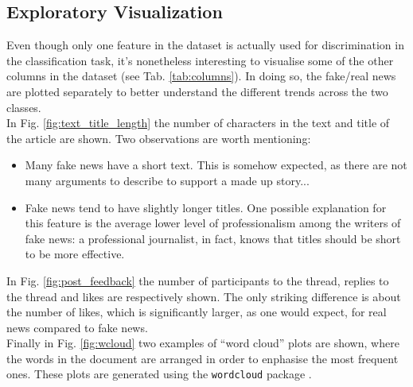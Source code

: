 \documentclass[a4paper,12pt]{article} %
\begin{document}
\subsection{Exploratory Visualization}
\label{sec:visuals}
Even though only one feature in the dataset is actually used for discrimination
in the classification task, it's nonetheless interesting to visualise
some of the other columns in the dataset (see Tab. \ref{tab:columns}).
In doing so, the fake/real news are plotted separately to better understand
the different trends across the two classes. \\
In Fig. \ref{fig:text_title_length} the number of characters in
the text and title of the article are shown.
Two observations are worth mentioning:
\begin{itemize}
\item Many fake news have a short text. This is somehow expected,
as there are not many arguments to describe to support a made up story...
\item Fake news tend to have slightly longer titles.
One possible explanation for this feature is the average lower level
of professionalism among the writers of fake news: a professional
journalist, in fact, knows that titles should be short to be more effective.
\end{itemize}
In Fig. \ref{fig:post_feedback} the
number of participants to the thread, replies to the thread and likes are respectively shown.
The only striking difference is about the number of likes, which is
significantly larger, as one would expect, for real news compared to fake news. \\
Finally in Fig. \ref{fig:wcloud} two examples of ``word cloud'' plots are shown,
where the words in the document are arranged in order to enphasise
the most frequent ones. These plots are generated using the \texttt{wordcloud} package \cite{wordcloud}.
\end{document}
